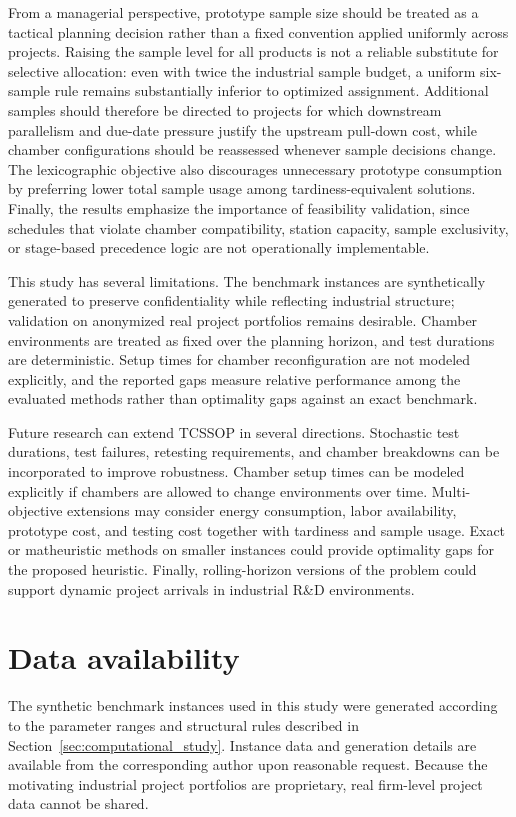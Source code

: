 \documentclass[11pt]{article}
\begin{document}
From a managerial perspective, prototype sample size should be treated as a tactical planning decision rather than a fixed convention applied uniformly across projects. Raising the sample level for all products is not a reliable substitute for selective allocation: even with twice the industrial sample budget, a uniform six-sample rule remains substantially inferior to optimized assignment. Additional samples should therefore be directed to projects for which downstream parallelism and due-date pressure justify the upstream pull-down cost, while chamber configurations should be reassessed whenever sample decisions change. The lexicographic objective also discourages unnecessary prototype consumption by preferring lower total sample usage among tardiness-equivalent solutions. Finally, the results emphasize the importance of feasibility validation, since schedules that violate chamber compatibility, station capacity, sample exclusivity, or stage-based precedence logic are not operationally implementable.

This study has several limitations. The benchmark instances are synthetically generated to preserve confidentiality while reflecting industrial structure; validation on anonymized real project portfolios remains desirable. Chamber environments are treated as fixed over the planning horizon, and test durations are deterministic. Setup times for chamber reconfiguration are not modeled explicitly, and the reported gaps measure relative performance among the evaluated methods rather than optimality gaps against an exact benchmark.

Future research can extend TCSSOP in several directions. Stochastic test durations, test failures, retesting requirements, and chamber breakdowns can be incorporated to improve robustness. Chamber setup times can be modeled explicitly if chambers are allowed to change environments over time. Multi-objective extensions may consider energy consumption, labor availability, prototype cost, and testing cost together with tardiness and sample usage. Exact or matheuristic methods on smaller instances could provide optimality gaps for the proposed heuristic. Finally, rolling-horizon versions of the problem could support dynamic project arrivals in industrial R\&D environments.

\section*{Data availability}
The synthetic benchmark instances used in this study were generated according to the parameter ranges and structural rules described in Section~\ref{sec:computational_study}. Instance data and generation details are available from the corresponding author upon reasonable request. Because the motivating industrial project portfolios are proprietary, real firm-level project data cannot be shared.



\end{document}
